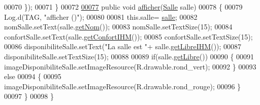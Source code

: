 \begin{DoxyCode}
00070         \});
00071     \}
00072 
\hyperlink{classcom_1_1lasalle_1_1meeting_1_1_salle_view_holder_ac9f5e4bd25c8abc50ad524e0c2132304}{00077}     \textcolor{keyword}{public} \textcolor{keywordtype}{void} \hyperlink{classcom_1_1lasalle_1_1meeting_1_1_salle_view_holder_ac9f5e4bd25c8abc50ad524e0c2132304}{afficher}(\hyperlink{classcom_1_1lasalle_1_1meeting_1_1_salle}{Salle} salle)
00078     \{
00079         Log.d(TAG, \textcolor{stringliteral}{"afficher ()"});
00080 
00081         this.salle= \hyperlink{classcom_1_1lasalle_1_1meeting_1_1_salle_view_holder_afe85265c9d35c5035e96ace9c8032606}{salle};
00082         nomSalle.setText(salle.\hyperlink{classcom_1_1lasalle_1_1meeting_1_1_salle_a49d977f69b2783e8ad57eccffc29e97b}{getNom}());
00083         nomSalle.setTextSize(15);
00084         confortSalle.setText(salle.\hyperlink{classcom_1_1lasalle_1_1meeting_1_1_salle_abf1f96423a1df46ba4d6ac4a1b6d0c34}{getConfortIHM}());
00085         confortSalle.setTextSize(15);
00086         disponibiliteSalle.setText(\textcolor{stringliteral}{"La salle est "}+ salle.\hyperlink{classcom_1_1lasalle_1_1meeting_1_1_salle_ab86dfb73018e96230ceed49e207a8971}{getLibreIHM}());
00087         disponibiliteSalle.setTextSize(15);
00088 
00089         \textcolor{keywordflow}{if}(salle.\hyperlink{classcom_1_1lasalle_1_1meeting_1_1_salle_adc0c4936355bc0ae22991f69c12a5e42}{getLibre}())
00090         \{
00091             imageDisponibiliteSalle.setImageResource(R.drawable.rond\_vert);
00092         \}
00093         \textcolor{keywordflow}{else}
00094         \{
00095             imageDisponibiliteSalle.setImageResource(R.drawable.rond\_rouge);
00096         \}
00097     \}
00098 \}
\end{DoxyCode}
